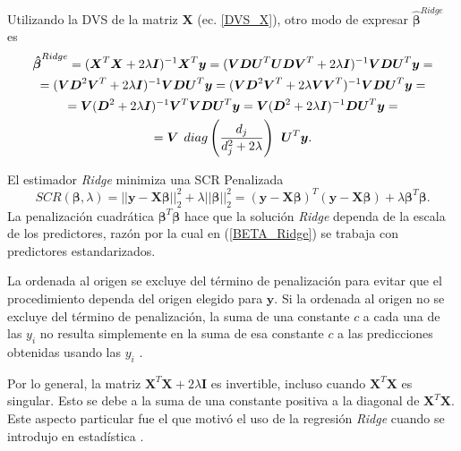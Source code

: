 \documentclass[a4paper,12pt]{report}
\begin{document}
Utilizando la DVS de la matriz $\boldsymbol{X}$ (ec. \ref{DVS_X}), otro modo de expresar $\boldsymbol{\hat{\beta}}^{Ridge}$ es
\begin{gather}
\nonumber
\boldsymbol{\hat{\beta}}^{Ridge}=(\boldsymbol{X}^T\boldsymbol{X}+2\lambda \boldsymbol{I})^{-1}\boldsymbol{X}^T\boldsymbol{y}=(\boldsymbol{VDU}^T\boldsymbol{UDV}^T+2\lambda \boldsymbol{I})^{-1}\boldsymbol{VDU}^T\boldsymbol{y}=\\
\nonumber
=(\boldsymbol{VD}^2\boldsymbol{V}^T+2\lambda \boldsymbol{I})^{-1}\boldsymbol{VDU}^T\boldsymbol{y}=(\boldsymbol{VD}^2\boldsymbol{V}^T+2\lambda \boldsymbol{VV}^T)^{-1}\boldsymbol{VDU}^T\boldsymbol{y}=\\
\nonumber
=\boldsymbol{V}(\boldsymbol{D}^2+2\lambda \boldsymbol{I})^{-1}\boldsymbol{V}^T\boldsymbol{VDU}^T\boldsymbol{y}=\boldsymbol{V}(\boldsymbol{D}^2+2\lambda \boldsymbol{I})^{-1}\boldsymbol{DU}^T\boldsymbol{y}=\\
\label{Ridge_estimator_DVS}
=\boldsymbol{V} \hspace{0.15cm} diag\left(\dfrac{d_j}{d_j^2+2\lambda}\right) \hspace{0.15cm} \boldsymbol{U}^T\boldsymbol{y}.
\end{gather}

El estimador \textit{Ridge} minimiza una SCR Penalizada
\begin{equation}
SCR(\boldsymbol{\beta},\lambda)=||\boldsymbol{y}-\boldsymbol{X\beta} ||_2^2+\lambda ||\boldsymbol{\beta}||_2^2=(\boldsymbol{y}-\boldsymbol{X}\boldsymbol{\beta})^T(\boldsymbol{y}-\boldsymbol{X}\boldsymbol{\beta})+\lambda \boldsymbol{\beta}^T\boldsymbol{\beta}.
\end{equation}
La penalización cuadrática $\boldsymbol{\beta}^T\boldsymbol{\beta}$ hace que la solución \textit{Ridge} dependa de la escala de los predictores, razón por la cual en (\ref{BETA_Ridge}) se trabaja con predictores estandarizados. 

La ordenada al origen se excluye del término de penalización para evitar que el procedimiento dependa del origen elegido para $\boldsymbol{y}$. Si la ordenada al origen no se excluye del término de penalización, la suma de una constante $c$ a cada una de las $y_i$ no resulta simplemente en la suma de esa constante $c$ a las predicciones obtenidas usando las $y_i$ \citep{friedman2001elements}.

Por lo general, la matriz $\boldsymbol{X}^T\boldsymbol{X}+2\lambda \boldsymbol{I}$ es invertible, incluso cuando $\boldsymbol{X}^T\boldsymbol{X}$ es singular. Esto se debe a la suma de una constante positiva a la diagonal de $\boldsymbol{X}^T\boldsymbol{X}$. Este aspecto particular fue el que motivó el uso de la regresión \textit{Ridge} cuando se introdujo en estadística \citep{hoerl1970ridge}.
\end{document}
